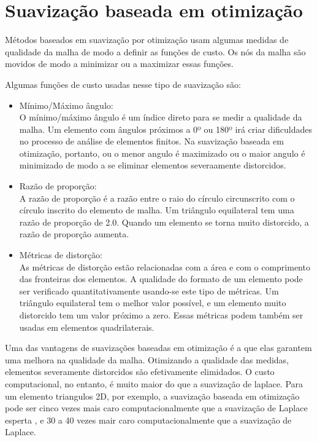 \section{Suavização baseada em otimização}

Métodos baseados em suavização por otimização usam algumas medidas de qualidade da malha de modo a definir as funções de custo. Os nós da malha são movidos de modo a minimizar ou a maximizar essas funções.

Algumas funções de custo usadas nesse tipo de suavização são:

\begin{itemize}
    \item Mínimo/Máximo ângulo:\\
    O mínimo/máximo ângulo é um índice direto para se medir a qualidade da malha. Um elemento com ângulos próximos a 0º ou 180º irá criar dificuldades no processo de análise de elementos finitos. Na suavização baseada em otimização, portanto, ou o menor angulo é maximizado ou o maior angulo é minimizado de modo a se eliminar elementos severaamente distorcidos.
    \item Razão de proporção:\\
    A razão de proporção é a razão entre o raio do círculo circunscrito com o círculo inscrito do elemento de malha. Um triângulo equilateral tem uma razão de proporção de 2.0. Quando um elemento se torna muito distorcido, a razão de proporção aumenta.
    \item Métricas de distorção:\\
    As métricas de distorção estão relacionadas com a área e com o comprimento das fronteiras dos elementos. A qualidade do formato de um elemento pode ser verificado quantitativamente usando-se este tipo de métricas. Um triângulo equilateral tem o melhor valor possível, e um elemento muito distorcido tem um valor próximo a zero. Essas métricas podem também ser usadas em elementos quadrilaterais.
\end{itemize}

Uma das vantagens de suavizações baseadas em otimização é a que elas garantem uma melhora na qualidade da malha. Otimizando a qualidade das medidas, elementos severamente distorcidos são efetivamente elimidados. O custo computacional, no entanto, é muito maior do que a suavização de laplace. Para um elemento triangulos 2D, por exemplo, a suavização baseada em otimização pode ser cinco vezes mais caro computacionalmente que a suavização de Laplace esperta \cite{Freitag1997OnCL}, e 30 a 40 vezes mair caro computacionalmente que a suavização de Laplace.

